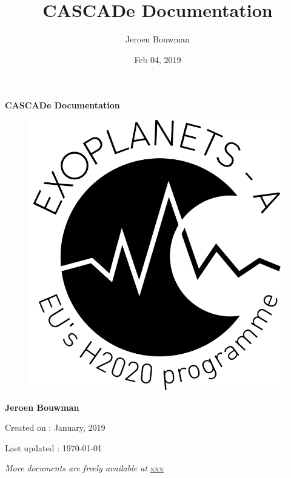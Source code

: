 \documentclass[a4paper,10pt,english]{sphinxmanual}
\title{CASCADe Documentation}
\date{Feb 04, 2019}
\author{Jeroen Bouwman}
\begin{document}
\pagestyle{empty}


        \begin{titlepage}
            \centering

            \vspace*{40mm} %
            \textbf{\Huge {CASCADe Documentation}}

            \vspace{0mm}
            \begin{figure}[!h]
                \centering
                \includegraphics[scale=0.3]{Exoplanets-A_Ecusson_Noir_Alpha.png}
            \end{figure}

            \vspace{0mm}
            \Large \textbf{{Jeroen Bouwman}}

            \small Created on : January, 2019

            \vspace*{0mm}
            \small  Last updated : \MonthYearFormat\today


            \vfill
            \small \textit{More documents are freely available at }{\href{http://xxx.html}{xxx}}
        \end{titlepage}
\end{document}
